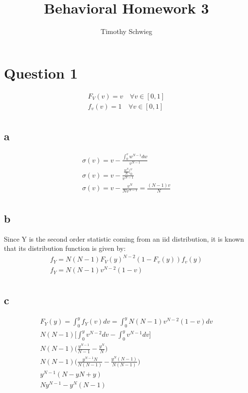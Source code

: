 \documentclass[10pt]{paper}
\title{Behavioral Homework 3} \author{Timothy Schwieg}
\begin{document}
\maketitle

\section*{Question 1}
\begin{align*}
  F_V(v) = v \quad \forall v \in [0,1]\\
  f_v(v) = 1 \quad \forall v \in [0,1]\\
\end{align*}

\subsection*{a}
\begin{align*}
  \sigma(v) = v - \frac{\int_0^v w^{N-1} dw}{v^{N-1}}\\
  \sigma(v) = v - \frac{\frac{w^N}{N} \big |_0^v}{v^{N-1}}\\
  \sigma(v) = v - \frac{v^N}{N v^{N-1}} = \frac{(N-1)v}{N}\\
\end{align*}

\subsection*{b}
Since Y is the second order statistic coming from an iid distribution,
it is known that its distribution function is given by:
\begin{align*}
  f_Y = N(N-1)F_V(y)^{N-2}(1-F_v(y))f_v(y)\\
  f_Y = N(N-1)v^{N-2}(1-v)\\
\end{align*}

\subsection*{c}
\begin{align*}
  F_Y(y) = \int_0^yf_Y(v)dv = \int_0^y N(N-1)v^{N-2}(1-v)dv \\
  N(N-1) \big [ \int_0^y v^{N-2}dv - \int_0^y v^{N-1} dv \big ]\\
  N(N-1) \big ( \frac{y^{N-1}}{N-1} - \frac{y^N}{N} \big )\\
  N(N-1) \big ( \frac{y^{N-1}N}{N(N-1)} - \frac{y^N(N-1)}{N(N-1)} \big )\\
  y^{N-1}( N - yN + y)\\
  Ny^{N-1} - y^N ( N - 1 )\\
\end{align*}
\end{document}
